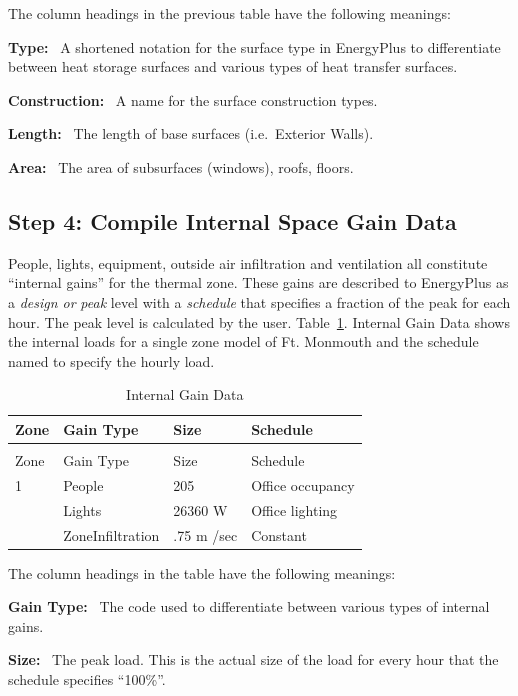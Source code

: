The column headings in the previous table have the following meanings:

\textbf{Type:}~ A shortened notation for the surface type in EnergyPlus to differentiate between heat storage surfaces and various types of heat transfer surfaces.

\textbf{Construction:}~ A name for the surface construction types.

\textbf{Length:}~ The length of base surfaces (i.e.~Exterior Walls).

\textbf{Area:}~ The area of subsurfaces (windows), roofs, floors.

\subsection{Step 4: Compile Internal Space Gain Data}\label{step-4-compile-internal-space-gain-data}

People, lights, equipment, outside air infiltration and ventilation all constitute ``internal gains'' for the thermal zone. These gains are described to EnergyPlus as a \emph{design or} \emph{peak} level with a \emph{schedule} that specifies a fraction of the peak for each hour. The peak level is calculated by the user. Table~\ref{table:internal-gain-data}. Internal Gain Data shows the internal loads for a single zone model of Ft. Monmouth and the schedule named to specify the hourly load.

\begin{longtable}[c]{@{}llll@{}}
\caption{Internal Gain Data \label{table:internal-gain-data}} \tabularnewline
\toprule 
Zone & Gain Type & Size & Schedule \tabularnewline
\midrule
\endfirsthead

\caption[]{Internal Gain Data} \tabularnewline
\toprule 
Zone & Gain Type & Size & Schedule \tabularnewline
\midrule
\endhead

1 & People & 205 & Office occupancy \tabularnewline
~ & Lights & 26360 W & Office lighting \tabularnewline
~ & ZoneInfiltration & .75 m  /sec & Constant \tabularnewline
\bottomrule
\end{longtable}

The column headings in the table have the following meanings:

\textbf{Gain Type:}~ The code used to differentiate between various types of internal gains.

\textbf{Size:}~ The peak load. This is the actual size of the load for every hour that the schedule specifies ``100\%''.

